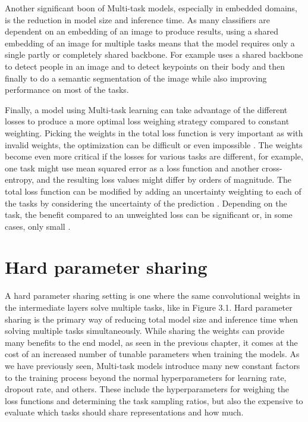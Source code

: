 Another significant boon of Multi-task models, especially in embedded domains, is the reduction in model size and inference time.
As many classifiers are dependent on an embedding of an image to produce results, using a shared embedding of an image for multiple tasks means that the model requires only a single partly or completely shared backbone.
For example \citep{multiPoseNet} uses a shared backbone to detect people in an image and to detect keypoints on their body and then finally to do a semantic segmentation of the image while also improving performance on most of the tasks.

Finally, a model using Multi-task learning can take advantage of the different losses to produce a more optimal loss weighing strategy compared to constant weighting.
Picking the weights in the total loss function is very important as with invalid weights, the optimization can be difficult or even impossible \citep{lossWeighting}.
The weights become even more critical if the losses for various tasks are different, for example, one task might use mean squared error as a loss function and another cross-entropy, and the resulting loss values might differ by orders of magnitude.
The total loss function can be modified by adding an uncertainty weighting to each of the tasks by considering the uncertainty of the prediction \citep{usingUncertaintyToWeighLosses}.
Depending on the task, the benefit compared to an unweighted loss can be significant \citep{usingUncertaintyToWeighLosses} or, in some cases, only small \citep{lossWeighting}.

\section{Hard parameter sharing}
A hard parameter sharing setting is one where the same convolutional weights in the intermediate layers solve multiple tasks, like in Figure 3.1.
Hard parameter sharing is the primary way of reducing total model size and inference time when solving multiple tasks simultaneously.
While sharing the weights can provide many benefits to the end model, as seen in the previous chapter, it comes at the cost of an increased number of tunable parameters when training the models.
As we have previously seen, Multi-task models introduce many new constant factors to the training process beyond the normal hyperparameters for learning rate, dropout rate, and others.
These include the hyperparameters for weighing the loss functions and determining the task sampling ratios, but also the expensive to evaluate which tasks should share representations and how much.

